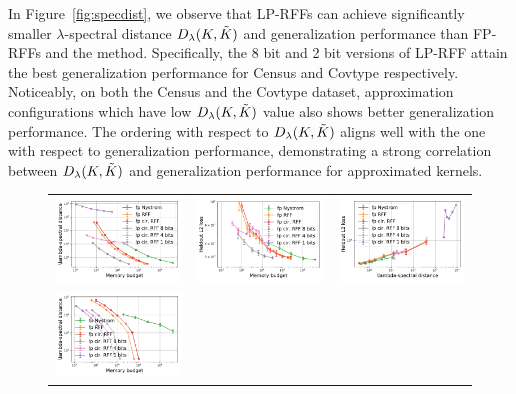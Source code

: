 In Figure~\ref{fig:specdist}, we observe that LP-RFFs can achieve significantly smaller $\lambda$-spectral distance $D_{\lambda}(K,\tilde{K})$ and generalization performance than FP-RFFs and the \Nystrom method. Specifically, the 8 bit and 2 bit versions of LP-RFF attain the best generalization performance for Census and Covtype respectively. Noticeably, on both the Census and the Covtype dataset, approximation configurations which have low $D_{\lambda}(K,\tilde{K})$ value also shows better generalization performance. The ordering with respect to $D_{\lambda}(K,\tilde{K})$ aligns well with the one with respect to generalization performance, demonstrating a strong correlation between $D_{\lambda}(K,\tilde{K})$ and generalization performance for approximated kernels. 

\begin{figure}
	\centering
	\begin{tabular}{c c c}
		\includegraphics[width=0.33\linewidth]{figures/regression_delta_vs_mem.pdf} &
		\includegraphics[width=0.33\linewidth]{figures/regression_l2_vs_mem.pdf} &
		\includegraphics[width=0.33\linewidth]{figures/regression_l2_vs_delta.pdf} \\
		\includegraphics[width=0.33\linewidth]{figures/classification_delta_vs_mem.pdf} &

\end{tabular}
\end{figure}
